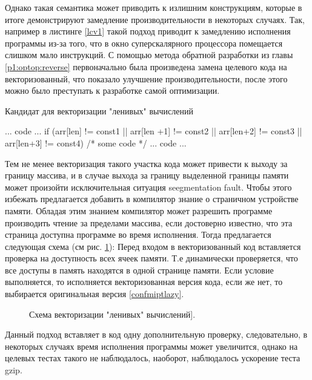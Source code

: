  Однако такая семантика может приводить к излишним конструкциям, которые в итоге демонстрируют замедление производительности в некоторых случаях.
 Так, например в листинге \ref{lcv1} такой подход приводит к замедлению исполнения программы из-за того, что в окно суперскалярного процессора помещается слишком мало инструкций. С помощью метода обратной разработки из главы \ref{p1:optop:reverse} первоначально была произведена замена целевого кода на векторизованный, что показало улучшение производительности, после этого можно было преступать к разработке самой оптимизации.
 
 \begin{ListingEnv}[!h]
 	\captiondelim{ } %
 	\caption{Кандидат для векторизации "ленивых"\phantom{ } вычислений}\label{lcv1}
 	
 	\begin{Verb}
... code ...
if (arr[len] != const1 || arr[len +1] != const2 
	|| arr[len+2] != const3  || arr[len+3] != const4) {
		/* some code */
	}
... code ...
 	\end{Verb}
 \end{ListingEnv}
 
 Тем не менее векторизация такого участка кода может привести к выходу за границу массива, и в случае выхода за границу выделенной границы памяти может произойти исключительная ситуация seegmentation fault. Чтобы этого избежать предлагается добавить в компилятор знание о страничном устройстве памяти. Обладая этим знанием компилятор может разрешить программе производить чтение за пределами массива, если достоверно известно, что эта страница доступна  программе во время исполнения. Тогда предлагается следующая схема (см рис. \ref{lcv2}):
Перед входом в векторизованный код вставляется проверка на доступность всех ячеек памяти. Т.е  динамически проверяется, что все доступы в память находятся в одной странице памяти. Если условие выполняется, то исполняется векторизованная версия кода, если же нет, то выбирается оригинальная версия \ref{confmiptlazy}.
 
 \begin{figure}[htbp]
 	\centering
 	
 	\caption{Схема векторизации "ленивых"\phantom{ } вычислений].}
 	\label{lcv2}
 \end{figure}
 
 Данный подход вставляет в код одну дополнительную проверку, следовательно, в некоторых случаях время исполнения программы может увеличится, однако на целевых тестах такого не наблюдалось, наоборот, наблюдалось ускорение теста gzip.
